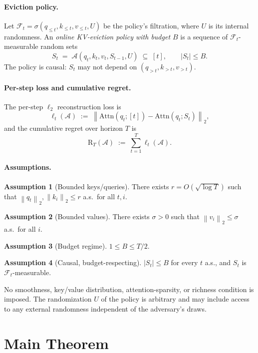 \documentclass{article}
\theoremstyle{definition}
\newtheorem{assumption}{Assumption}
\theoremstyle{remark}
\newcommand{\F}{\mathcal{F}}
\newcommand{\A}{\mathcal{A}}
\newcommand{\Reg}{\mathrm{R}}
\newcommand{\Attn}{\mathrm{Attn}}
\newcommand{\norm}[1]{\left\lVert #1 \right\rVert}
\begin{document}
\paragraph{Eviction policy.}
Let $\F_t=\sigma(q_{\le t},k_{\le t},v_{\le t},U)$ be the policy's filtration, where $U$ is its internal randomness. An \emph{online KV-eviction policy with budget $B$} is a sequence of $\F_t$-measurable random sets
\[
S_t \;=\; \A(q_t,k_t,v_t,S_{t-1},U)\;\subseteq\;[t],\qquad |S_t|\le B.
\]
The policy is causal: $S_t$ may not depend on $(q_{>t},k_{>t},v_{>t})$.

\paragraph{Per-step loss and cumulative regret.}
The per-step $\ell_2$ reconstruction loss is
\[
\ell_t(\A) \;:=\; \norm{\Attn(q_t;[t])-\Attn(q_t;S_t)}_2,
\]
and the cumulative regret over horizon $T$ is
\begin{equation}
\Reg_T(\A) \;:=\; \sum_{t=1}^{T}\ell_t(\A).
\end{equation}

\paragraph{Assumptions.}
\begin{assumption}[Bounded keys/queries]\label{ass:bounded}
There exists $r=O(\sqrt{\log T})$ such that $\norm{q_t}_2,\norm{k_i}_2\le r$ a.s.\ for all $t,i$.
\end{assumption}
\begin{assumption}[Bounded values]\label{ass:values}
There exists $\sigma>0$ such that $\norm{v_i}_2\le\sigma$ a.s.\ for all $i$.
\end{assumption}
\begin{assumption}[Budget regime]\label{ass:budget}
$1\le B\le T/2$.
\end{assumption}
\begin{assumption}[Causal, budget-respecting]\label{ass:causal}
$|S_t|\le B$ for every $t$ a.s., and $S_t$ is $\F_t$-measurable.
\end{assumption}

No smoothness, key/value distribution, attention-sparsity, or richness condition is imposed. The randomization $U$ of the policy is arbitrary and may include access to any external randomness independent of the adversary's draws.

\section{Main Theorem}
\label{sec:thm}
\end{document}
